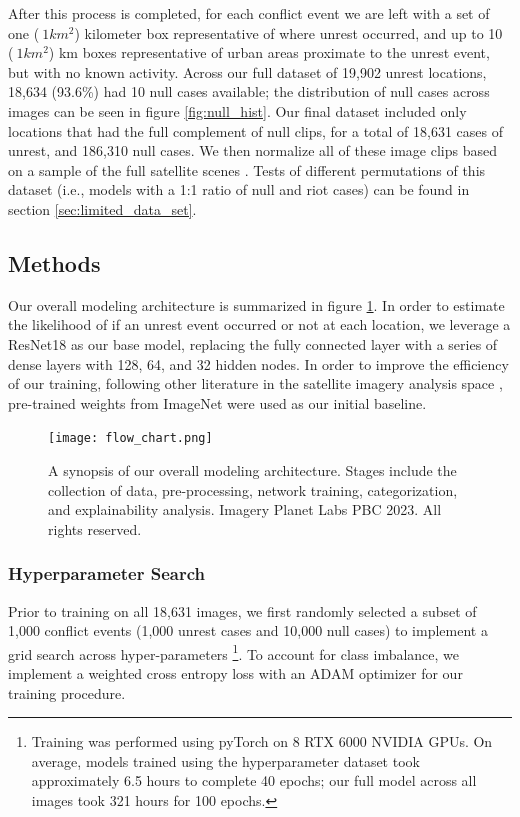 After this process is completed, for each conflict event we are left with a set of one ($\ 1 km^{2} $) kilometer box representative of where unrest occurred, and up to 10 ($\ 1 km^{2}$)  km boxes representative of urban areas proximate to the unrest event, but with no known activity.  Across our full dataset of 19,902 unrest locations, 18,634 (93.6\%) had 10 null cases available; the distribution of null cases across images can be seen in figure \ref{fig:null_hist}. Our final dataset included only locations that had the full complement of null clips, for a total of 18,631 cases of unrest, and 186,310 null cases. We then normalize all of these image clips based on a sample of the full satellite scenes \citep{goodman2021convolutional, runfola2022deep, lv2024mapping, brewer2023tracking}.  Tests of different permutations of this dataset (i.e., models with a 1:1 ratio of null and riot cases) can be found in section \ref{sec:limited_data_set}.



\subsection{Methods}\label{sec:methods_paper1}
Our overall modeling architecture is summarized in figure \ref{fig:flow_chart}. In order to estimate the likelihood of if an unrest event occurred or not at each location, we leverage a ResNet18 \citep{he2016deep} as our base model, replacing the fully connected layer with a series of dense layers with 128, 64, and 32 hidden nodes.  In order to improve the efficiency of our training, following other literature in the satellite imagery analysis space \citep{goodman2021convolutional, brewer2021predicting, runfola2022deep, lv2024mapping, brewer2023tracking}, pre-trained weights from ImageNet were used as our initial baseline. 

\begin{figure}
    \centering
    \texttt{[image: flow\_chart.png]}
    \caption{A synopsis of our overall modeling architecture.  Stages include the collection of data, pre-processing, network training, categorization, and explainability analysis. Imagery \textcopyright Planet Labs PBC 2023. All rights reserved.}
    \label{fig:flow_chart}
\end{figure}

\subsubsection{Hyperparameter Search}
Prior to training on all 18,631 images, we first randomly selected a subset of 1,000 conflict events (1,000 unrest cases and 10,000 null cases) to implement a grid search across hyper-parameters \footnote{Training was performed using pyTorch on 8 RTX 6000 NVIDIA GPUs.  On average, models trained using the hyperparameter dataset took approximately 6.5 hours to complete 40 epochs; our full model across all images took 321 hours for 100 epochs.}. To account for class imbalance, we implement a weighted cross entropy loss \citep{ho2019real} with an ADAM optimizer \citep{kingma2014adam} for our training procedure.  


